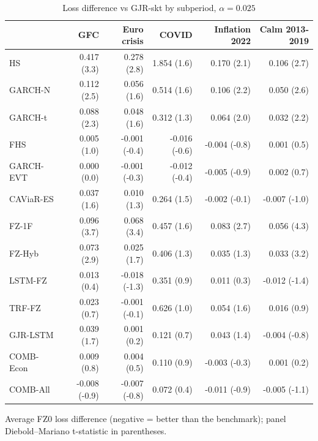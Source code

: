 \begin{table}[htbp]
\centering
\footnotesize
\caption{Loss difference vs GJR-skt by subperiod, $\alpha=0.025$}
\label{tab:sub}
\begin{tabular}{lrrrrr}
\toprule
 & GFC & Euro crisis & COVID & Inflation 2022 & Calm 2013-2019 \\
\midrule
HS & 0.417 (3.3) & 0.278 (2.8) & 1.854 (1.6) & 0.170 (2.1) & 0.106 (2.7) \\
GARCH-N & 0.112 (2.5) & 0.056 (1.6) & 0.514 (1.6) & 0.106 (2.2) & 0.050 (2.6) \\
GARCH-t & 0.088 (2.3) & 0.048 (1.6) & 0.312 (1.3) & 0.064 (2.0) & 0.032 (2.2) \\
FHS & 0.005 (1.0) & -0.001 (-0.4) & -0.016 (-0.6) & -0.004 (-0.8) & 0.001 (0.5) \\
GARCH-EVT & 0.000 (0.0) & -0.001 (-0.3) & -0.012 (-0.4) & -0.005 (-0.9) & 0.002 (0.7) \\
CAViaR-ES & 0.037 (1.6) & 0.010 (1.3) & 0.264 (1.5) & -0.002 (-0.1) & -0.007 (-1.0) \\
FZ-1F & 0.096 (3.7) & 0.068 (3.4) & 0.457 (1.6) & 0.083 (2.7) & 0.056 (4.3) \\
FZ-Hyb & 0.073 (2.9) & 0.025 (1.7) & 0.406 (1.3) & 0.035 (1.3) & 0.033 (3.2) \\
LSTM-FZ & 0.013 (0.4) & -0.018 (-1.3) & 0.351 (0.9) & 0.011 (0.3) & -0.012 (-1.4) \\
TRF-FZ & 0.023 (0.7) & -0.001 (-0.1) & 0.626 (1.0) & 0.054 (1.6) & 0.016 (0.9) \\
GJR-LSTM & 0.039 (1.7) & 0.001 (0.2) & 0.121 (0.7) & 0.043 (1.4) & -0.004 (-0.8) \\
COMB-Econ & 0.009 (0.8) & 0.004 (0.5) & 0.110 (0.9) & -0.003 (-0.3) & 0.001 (0.2) \\
COMB-All & -0.008 (-0.9) & -0.007 (-0.8) & 0.072 (0.4) & -0.011 (-0.9) & -0.005 (-1.1) \\
\bottomrule
\end{tabular}
\par\smallskip\parbox{\linewidth}{\scriptsize Average FZ0 loss difference (negative = better than the benchmark); panel Diebold--Mariano t-statistic in parentheses.}
\end{table}